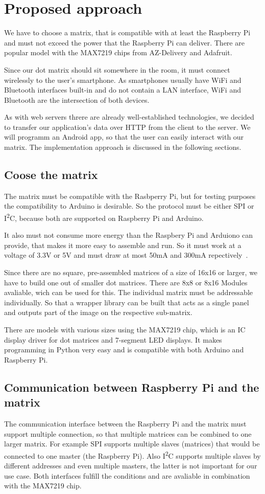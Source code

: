 \documentclass[conference]{IEEEtran}
\begin{document}
\section{Proposed approach}
We have to choose a matrix, that is compatible with at least the Raspberry Pi and must not exceed the power that the Raspberry Pi can deliver. There are popular model with the MAX7219 chips from AZ-Delivery and Adafruit.

Since our dot matrix should sit somewhere in the room, it must connect wirelessly to the user's smartphone. As smartphones usually have WiFi and Bluetooth interfaces built-in and do not contain a LAN interface, WiFi and Bluetooth are the intersection of both devices.

As with web servers threre are already well-established technologies, we decided to transfer our application's data over HTTP from the client to the server. We will programm an Android app, so that the user can easily interact with our matrix. The implementation approach is discussed in the following sections.


\subsection{Coose the matrix}
The matrix must be compatible with the Rasbperry Pi, but for testing purposes the compatibility to Arduino is desirable. So the protocol must be either SPI or I\textsuperscript{2}C, because both are supported on Raspberry Pi and Arduino.

It also must not consume more energy than the Raspbery Pi and Arduiono can provide, that makes it more easy to assemble and run. So it must work at a voltage of 3.3V or 5V and must draw at most 50mA and 300mA repectively~\cite{rpiperipherals}.

Since there are no square, pre-assembled matrices of a size of 16x16 or larger, we have to build one out of smaller dot matrices. There are 8x8 or 8x16 Modules avaliable, wich can be used for this. The individual matrix must be addressable individually. So that a wrapper library can be built that acts as a single panel and outputs part of the image on the respective sub-matrix.

There are models with various sizes using the MAX7219 chip, which is an IC display driver for dot matrices and 7-segment LED displays. It makes programming in Python very easy and is compatible with both Arduino and Raspberry Pi.

\subsection{Communication between Raspberry Pi and the matrix}
The communication interface between the Raspberry Pi and the matrix must support multiple connection, so that multiple matrices can be combined to one larger matrix. For example SPI supports multiple slaves (matrices) that would be connected to one master (the Raspberry Pi). Also I\textsuperscript{2}C supports multiple slaves by different addresses and even multiple masters, the latter is not important for our use case. Both interfaces fulfill the conditions and are avaliable in combination with the MAX7219 chip.
\end{document}
